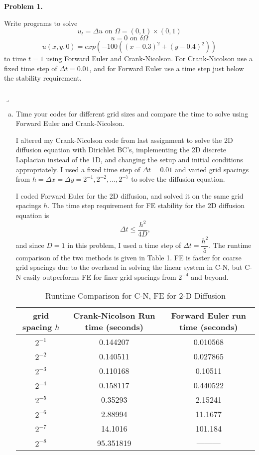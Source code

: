 \documentclass[12pt]{article}
\newenvironment{myprob}[1]
    {%
    \noindent{\Huge$\ulcorner$}\textbf{#1.}\begin{em}
    }
    { 
    \end{em} \\ \hphantom{l} \hfill {\Huge$\lrcorner$} }
\begin{document}
\rhead{\today}

{\let\newpage\relax} 


\begin{myprob}{Problem 1}
Write programs to solve
$$u_t = \Delta u \text{ on } \Omega = (0,1) \times (0,1)$$
$$u=0 \text{ on } \delta \Omega$$
$$u(x,y,0) = exp(-100((x-0.3)^2+(y-0.4)^2))$$
to time $t=1$ using Forward Euler and Crank-Nicolson.  For Crank-Nicolson use a fixed time step of $\Delta t = 0.01$, and for Forward Euler use a time step just below the stability requirement.
\end{myprob}
\begin{enumerate}[(a)]
\item Time your codes for different grid sizes and compare the time to solve using Forward Euler and Crank-Nicolson.

I altered my Crank-Nicolson code from last assignment to solve the 2D diffusion equation with Dirichlet BC's, implementing the 2D discrete Laplacian instead of the 1D, and changing the setup and initial conditions appropriately.  I used a fixed time step of $\Delta t = 0.01$ and varied grid spacings from $h = \Delta x = \Delta y = 2^{-1}, 2^{-2}, \dots, 2^{-7}$ to solve the diffusion equation.

I coded Forward Euler for the 2D diffusion, and solved it on the same grid spacings $h$.  The time step requirement for FE stability for the 2D diffusion equation is $$\Delta t \leq \dfrac{h^2}{4 D},$$
and since $D=1$ in this problem, I used a time step of $\Delta t = \dfrac{h^2}{5}.$
The runtime comparison of the two methods is given in Table 1.  FE is faster for coarse grid spacings due to the overhead in solving the linear system in C-N, but C-N easily outperforms FE for finer grid spacings from $2^{-4}$ and beyond.

\begin{table}[H]
\caption{Runtime Comparison for C-N, FE for 2-D Diffusion}
\centering\begin{tabular}{||c|c|c||}
\hline \hline
   grid spacing $h$ &  Crank-Nicolson Run time (seconds) &   Forward Euler run time (seconds) \\
\hline
    $2^{-1}$ &                  0.144207 &                 0.010568 \\
    $2^{-2}$ &                  0.140511 &                 0.027865 \\
    $2^{-3}$ &                  0.110168 &                 0.10511  \\
    $2^{-4}$ &                  0.158117 &                 0.440522 \\
    $2^{-5}$ &                  0.35293  &                 2.15241  \\
    $2^{-6}$ &                  2.88994  &                11.1677   \\
    $2^{-7}$ &                 14.1016   &               101.184    \\
    $2^{-8}$ &                 95.351819 &                --------- \\ 
\hline \hline
\end{tabular}
\end{table}


\end{enumerate}
\end{document}
